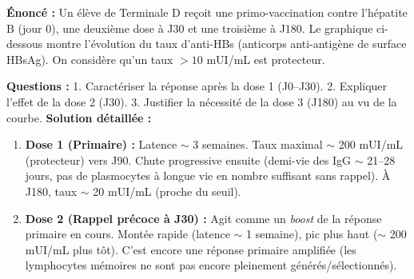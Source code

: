 \documentclass[11pt]{article}
\begin{document}
\begin{exoresolu}
\textbf{Énoncé :} Un élève de Terminale D reçoit une primo-vaccination contre l'hépatite B (jour 0), une deuxième dose à J30 et une troisième à J180. Le graphique ci-dessous montre l'évolution du taux d'anti-HBs (anticorps anti-antigène de surface HBsAg). On considère qu'un taux $> 10$ mUI/mL est protecteur.
\begin{center}
\end{center}
\textbf{Questions :}
1. Caractériser la réponse après la dose 1 (J0--J30).
2. Expliquer l'effet de la dose 2 (J30).
3. Justifier la nécessité de la dose 3 (J180) au vu de la courbe.
\textbf{Solution détaillée :}
\begin{enumerate}
\item \textbf{Dose 1 (Primaire) :} Latence $\sim$ 3 semaines. Taux maximal $\sim$ 200 mUI/mL (protecteur) vers J90. Chute progressive ensuite (demi-vie des IgG $\sim$ 21--28 jours, pas de plasmocytes à longue vie en nombre suffisant sans rappel). À J180, taux $\sim$ 20 mUI/mL (proche du seuil).
\item \textbf{Dose 2 (Rappel précoce à J30) :} Agit comme un \emph{boost} de la réponse primaire en cours. Montée rapide (latence $\sim$ 1 semaine), pic plus haut ($\sim$ 200 mUI/mL plus tôt). C'est encore une réponse primaire amplifiée (les lymphocytes mémoires ne sont pas encore pleinement générés/sélectionnés).

\end{enumerate}
\end{exoresolu}
\end{document}
